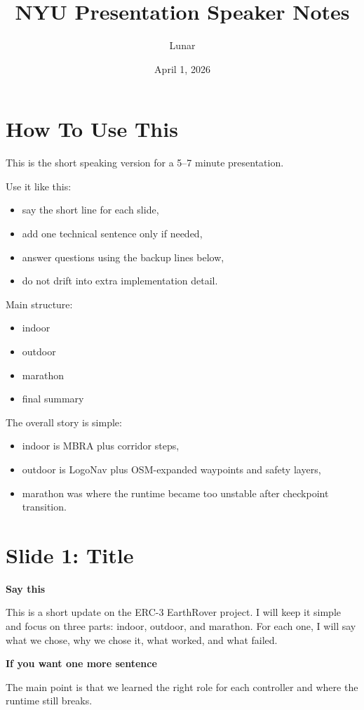 \documentclass[11pt]{article}
\title{NYU Presentation Speaker Notes}
\author{Lunar}
\date{April 1, 2026}
\begin{document}
\maketitle
\thispagestyle{empty}

\section*{How To Use This}
This is the short speaking version for a 5--7 minute presentation.

Use it like this:
\begin{itemize}[leftmargin=*]
\item say the short line for each slide,
\item add one technical sentence only if needed,
\item answer questions using the backup lines below,
\item do not drift into extra implementation detail.
\end{itemize}

Main structure:
\begin{itemize}[leftmargin=*]
\item indoor
\item outdoor
\item marathon
\item final summary
\end{itemize}

The overall story is simple:
\begin{itemize}[leftmargin=*]
\item indoor is MBRA plus corridor steps,
\item outdoor is LogoNav plus OSM-expanded waypoints and safety layers,
\item marathon was where the runtime became too unstable after checkpoint transition.
\end{itemize}

\section*{Slide 1: Title}
\textbf{Say this}

This is a short update on the ERC-3 EarthRover project. I will keep it simple and focus on three parts: indoor, outdoor, and marathon. For each one, I will say what we chose, why we chose it, what worked, and what failed.

\textbf{If you want one more sentence}

The main point is that we learned the right role for each controller and where the runtime still breaks.
\end{document}
